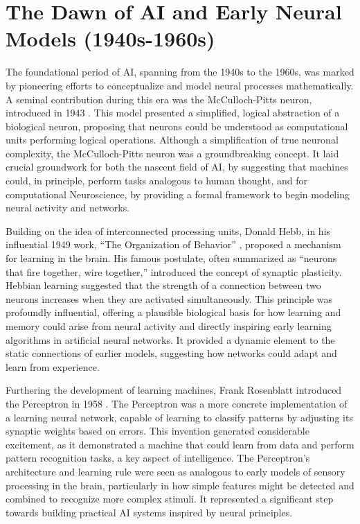 \documentclass[11pt,a4paper]{article}
\begin{document}
\section{The Dawn of AI and Early Neural Models (1940s-1960s)}

The foundational period of AI, spanning from the 1940s to the 1960s, was marked by pioneering efforts to conceptualize and model neural processes mathematically. A seminal contribution during this era was the McCulloch-Pitts neuron, introduced in 1943 \cite{mcculloch1943logical}. This model presented a simplified, logical abstraction of a biological neuron, proposing that neurons could be understood as computational units performing logical operations. Although a simplification of true neuronal complexity, the McCulloch-Pitts neuron was a groundbreaking concept. It laid crucial groundwork for both the nascent field of AI, by suggesting that machines could, in principle, perform tasks analogous to human thought, and for computational Neuroscience, by providing a formal framework to begin modeling neural activity and networks.

Building on the idea of interconnected processing units, Donald Hebb, in his influential 1949 work, ``The Organization of Behavior'' \cite{hebb1949organization}, proposed a mechanism for learning in the brain. His famous postulate, often summarized as ``neurons that fire together, wire together,'' introduced the concept of synaptic plasticity. Hebbian learning suggested that the strength of a connection between two neurons increases when they are activated simultaneously. This principle was profoundly influential, offering a plausible biological basis for how learning and memory could arise from neural activity and directly inspiring early learning algorithms in artificial neural networks. It provided a dynamic element to the static connections of earlier models, suggesting how networks could adapt and learn from experience.

Furthering the development of learning machines, Frank Rosenblatt introduced the Perceptron in 1958 \cite{rosenblatt1958perceptron}. The Perceptron was a more concrete implementation of a learning neural network, capable of learning to classify patterns by adjusting its synaptic weights based on errors. This invention generated considerable excitement, as it demonstrated a machine that could learn from data and perform pattern recognition tasks, a key aspect of intelligence. The Perceptron's architecture and learning rule were seen as analogous to early models of sensory processing in the brain, particularly in how simple features might be detected and combined to recognize more complex stimuli. It represented a significant step towards building practical AI systems inspired by neural principles.
\end{document}
